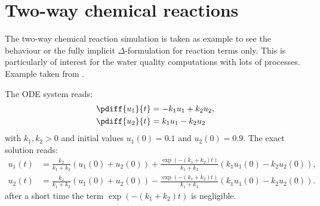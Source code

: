 \documentclass{mooiman_memo}
\begin{document}
    \memoConfidentialUntil{}
    \memoDate{\today~\currenttime}
    \memoCopy{}

    \mooimantitle

\section{Two-way chemical reactions}
The two-way chemical reaction simulation is taken as example to see the behaviour or the fully implicit $\Delta$-formulation for reaction terms only.
This is particularly of interest for the water quality computations with lots of processes.
Example taken from \citet{HundsdorferAndVerwer2003}.

The  ODE system reads:
\begin{align}
    \pdiff{u_1}{t} & = -k_1 u_1 + k_2 u_2,
    \\
    \pdiff{u_2}{t} & = k_1 u_1 - k_2 u_2
\end{align}
with $k_1, k_2 > 0$ and initial values  $u_1(0)=0.1$ and $u_2(0) = 0.9$.
The exact solution reads:
\begin{align}
u_1(t) & =\frac{k_2}{k_1+k_2}\left( u_1(0) + u_2(0) \right)
+ \frac{\exp\left( -(k_1 + k_2)t \right)}{k_1+k_2}\left(   k_1 u_1(0) - k_2 u_2(0) \right),
\\
u_2(t) & = \frac{k_1}{k_1+k_2}\left( u_1(0) + u_2(0) \right)
- \frac{\exp\left( -(k_1 + k_2)t \right)}{k_1+k_2}\left(   k_1 u_1(0) - k_2 u_2(0) \right).
\end{align}
after a short time the term $\exp\left( -(k_1 + k_2)t \right)$ is negligible.
\end{document}
